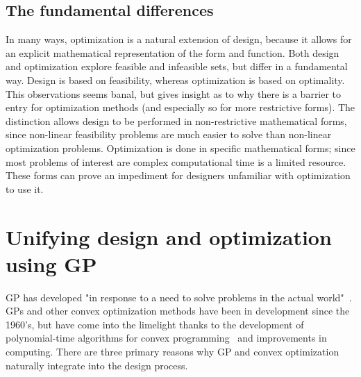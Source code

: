 \subsection{The fundamental differences}

In many ways, optimization is a natural extension of design, because it allows
for an explicit mathematical representation of the form and function. Both design and
optimization explore feasible and infeasible sets, but differ in a fundamental way.
Design is based on feasibility, whereas optimization is based on optimality.
This observations seems banal, but gives insight as to why there is a barrier
to entry for optimization methods (and especially so for more restrictive forms).
The distinction allows design to be performed
in non-restrictive mathematical forms, since non-linear feasibility problems are
much easier to solve than non-linear optimization problems. Optimization is
done in specific mathematical forms; since most problems of interest are complex
computational time is a limited resource. These forms can prove
an impediment for designers unfamiliar with optimization to use it.

\section{Unifying design and optimization using GP}

\gls{GP} has developed "in response to a need to solve problems in the actual 
world"~\cite{duffingp}. \gls{GP}s and other convex optimization methods have been
in development since the 1960's, but have come into the limelight thanks to the development of
polynomial-time algorithms for convex programming~\cite{interior_point} and
improvements in computing. There are three primary reasons why \gls{GP} and convex
optimization naturally integrate into the design process.

